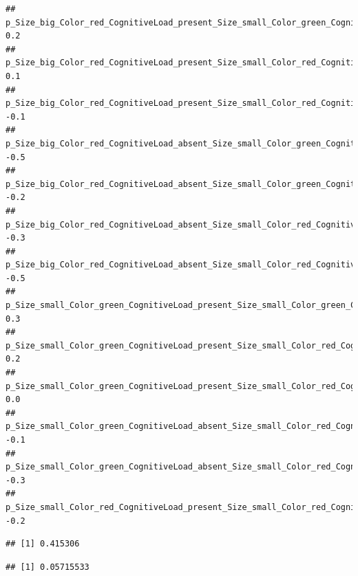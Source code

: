 \documentclass[]{book}
\newenvironment{Shaded}{\begin{snugshade}}{\end{snugshade}}
\newcommand{\CommentTok}[1]{\textcolor[rgb]{0.56,0.35,0.01}{\textit{#1}}}
\newcommand{\KeywordTok}[1]{\textcolor[rgb]{0.13,0.29,0.53}{\textbf{#1}}}
\newcommand{\NormalTok}[1]{#1}
\newcommand{\OperatorTok}[1]{\textcolor[rgb]{0.81,0.36,0.00}{\textbf{#1}}}
\newcommand{\StringTok}[1]{\textcolor[rgb]{0.31,0.60,0.02}{#1}}
\begin{document}
\begin{verbatim}
## p_Size_big_Color_red_CognitiveLoad_present_Size_small_Color_green_CognitiveLoad_absent             0.2
## p_Size_big_Color_red_CognitiveLoad_present_Size_small_Color_red_CognitiveLoad_present              0.1
## p_Size_big_Color_red_CognitiveLoad_present_Size_small_Color_red_CognitiveLoad_absent              -0.1
## p_Size_big_Color_red_CognitiveLoad_absent_Size_small_Color_green_CognitiveLoad_present            -0.5
## p_Size_big_Color_red_CognitiveLoad_absent_Size_small_Color_green_CognitiveLoad_absent             -0.2
## p_Size_big_Color_red_CognitiveLoad_absent_Size_small_Color_red_CognitiveLoad_present              -0.3
## p_Size_big_Color_red_CognitiveLoad_absent_Size_small_Color_red_CognitiveLoad_absent               -0.5
## p_Size_small_Color_green_CognitiveLoad_present_Size_small_Color_green_CognitiveLoad_absent         0.3
## p_Size_small_Color_green_CognitiveLoad_present_Size_small_Color_red_CognitiveLoad_present          0.2
## p_Size_small_Color_green_CognitiveLoad_present_Size_small_Color_red_CognitiveLoad_absent           0.0
## p_Size_small_Color_green_CognitiveLoad_absent_Size_small_Color_red_CognitiveLoad_present          -0.1
## p_Size_small_Color_green_CognitiveLoad_absent_Size_small_Color_red_CognitiveLoad_absent           -0.3
## p_Size_small_Color_red_CognitiveLoad_present_Size_small_Color_red_CognitiveLoad_absent            -0.2
\end{verbatim}

\begin{Shaded}
\end{Shaded}

\begin{verbatim}
## [1] 0.415306
\end{verbatim}

\begin{Shaded}
\end{Shaded}

\begin{verbatim}
## [1] 0.05715533
\end{verbatim}
\end{document}
